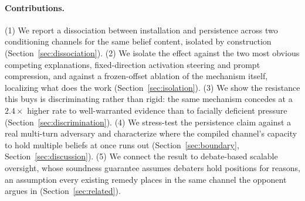 \paragraph{Contributions.} (1) We report a dissociation between installation and
persistence across two conditioning channels for the same belief content, isolated by
construction (Section~\ref{sec:dissociation}). (2) We isolate the effect against the
two most obvious competing explanations, fixed-direction activation steering and prompt
compression, and against a frozen-offset ablation of the mechanism itself, localizing
what does the work\iflongversion{} (Section~\ref{sec:isolation})\fi. (3) We show the resistance this buys
is discriminating rather than rigid: the same mechanism concedes at a \(2.4\times\)
higher rate to well-warranted evidence than to facially deficient pressure
(Section~\ref{sec:discrimination}). (4) We stress-test the persistence claim against a
real multi-turn adversary and characterize where the compiled channel's capacity to hold
multiple beliefs at once runs out (Section~\ref{sec:boundary},
Section~\ref{sec:discussion}). (5) We connect the result to debate-based scalable
oversight, whose soundness guarantee assumes debaters hold positions for reasons, an
assumption every existing remedy places in the same channel the opponent argues
in\iflongversion{} (Section~\ref{sec:related})\fi.
